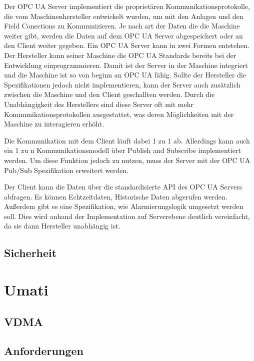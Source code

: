 \documentclass[a4paper, 12pt, oneside]{scrbook}
\begin{document}
		Der OPC UA Server implementiert die proprietären Kommunikationsprotokolle, die vom Maschinenhersteller entwickelt wurden, um mit den Anlagen und den Field Conections zu Kommunizieren. Je nach art der Daten die die Maschine weiter gibt, werden die Daten auf dem OPC UA Server abgespeichert oder an den Client weiter gegeben. Ein OPC UA Server kann in zwei Formen entstehen. Der Hersteller kann seiner Maschine die OPC UA Standards bereits bei der Entwicklung einprogrammieren. Damit ist der Server in der Maschine integriert und die Maschine ist so von beginn an OPC UA fähig. Sollte der Hersteller die Spezifikationen jedoch nicht implementieren, kann der Server auch zusätzlich zwischen die Maschine und den Client geschallten werden. Durch die Unabhängigkeit des Herstellers sind diese Server oft mit mehr Kommunikationsprotokollen ausgestattet, was deren Möglichkeiten mit der Maschine zu interagieren erhöht. 
		
		Die Kommunikation mit dem Client läuft dabei 1 zu 1 ab. Allerdings kann auch ein 1 zu n Kommunikationsmodell über Publish and Subscribe implementiert werden. Um diese Funktion jedoch zu nutzen, muss der Server mit der OPC UA Pub/Sub Spezifikation erweitert werden.
		
		Der Client kann die Daten über die standardisierte API des OPC UA Servers abfragen. Es können Echtzeitdaten, Historische Daten abgerufen werden. Außerdem gibt es eine Spezifikation, wie Alarmierungslogik umgesetzt werden soll. Dies wird anhand der Implementation auf Serverebene deutlich vereinfacht, da sie dann Hersteller unabhängig ist.
		
		
		
		\subsection{Sicherheit}
		
	
	\section{Umati}
	
	
		\subsection{VDMA}
		\subsection{Anforderungen}
\end{document}
